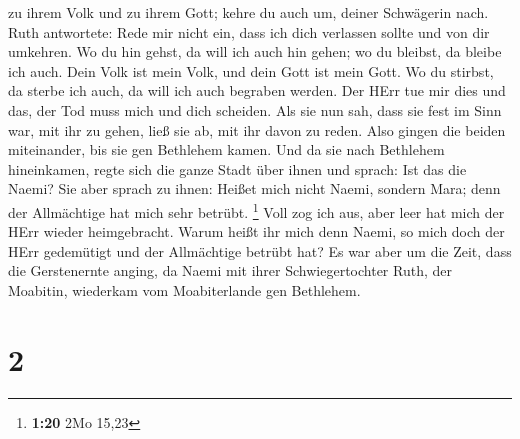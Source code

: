zu ihrem Volk und zu ihrem Gott; kehre du auch um, deiner Schwägerin
nach.  Ruth antwortete: Rede mir nicht ein, dass ich dich
verlassen sollte und von dir umkehren. Wo du hin gehst, da will ich auch
hin gehen; wo du bleibst, da bleibe ich auch. Dein Volk ist mein Volk,
und dein Gott ist mein Gott.  Wo du stirbst, da sterbe
ich auch, da will ich auch begraben werden. Der HErr tue mir dies und
das, der Tod muss mich und dich scheiden.  Als sie nun
sah, dass sie fest im Sinn war, mit ihr zu gehen, ließ sie ab, mit ihr
davon zu reden.  Also gingen die beiden miteinander, bis
sie gen Bethlehem kamen. Und da sie nach Bethlehem hineinkamen, regte
sich die ganze Stadt über ihnen und sprach: Ist das die Naemi?
 Sie aber sprach zu ihnen: Heißet mich nicht Naemi,
sondern Mara; denn der Allmächtige hat mich sehr betrübt. \footnote{\textbf{1:20}
  2Mo 15,23}  Voll zog ich aus, aber leer hat mich der
HErr wieder heimgebracht. Warum heißt ihr mich denn Naemi, so mich doch
der HErr gedemütigt und der Allmächtige betrübt hat?  Es
war aber um die Zeit, dass die Gerstenernte anging, da Naemi mit ihrer
Schwiegertochter Ruth, der Moabitin, wiederkam vom Moabiterlande gen
Bethlehem.

\hypertarget{section-1}{%
\section{2}\label{section-1}}

